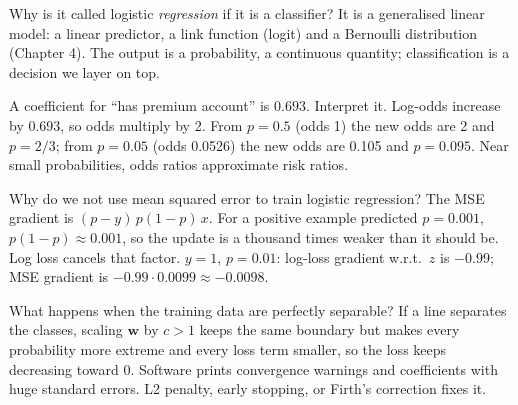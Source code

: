 \begin{qa}{Why is it called logistic \emph{regression} if it is a classifier?}
\why It is a generalised linear model: a linear predictor, a link function (logit) and a Bernoulli distribution
(Chapter 4). The output is a probability, a continuous quantity; classification is a decision we layer on top.
\end{qa}

\begin{qa}{A coefficient for ``has premium account'' is $0.693$. Interpret it.}
\why Log-odds increase by 0.693, so odds multiply by 2. From $p = 0.5$ (odds 1) the new odds are 2 and $p = 2/3$; from
$p=0.05$ (odds 0.0526) the new odds are 0.105 and $p = 0.095$. Near small probabilities, odds ratios approximate risk
ratios.
\end{qa}

\begin{qa}{Why do we not use mean squared error to train logistic regression?}
\why The MSE gradient is $(p - y)\,p(1-p)\,x$. For a positive example predicted $p = 0.001$, $p(1-p)\approx0.001$, so
the update is a thousand times weaker than it should be. Log loss cancels that factor.
\worked $y = 1$, $p = 0.01$: log-loss gradient w.r.t.\ $z$ is $-0.99$; MSE gradient is $-0.99\cdot0.0099\approx -0.0098$.
\end{qa}

\begin{qa}{What happens when the training data are perfectly separable?}
\why If a line separates the classes, scaling $\mathbf w$ by $c>1$ keeps the same boundary but makes every probability
more extreme and every loss term smaller, so the loss keeps decreasing toward 0. Software prints convergence warnings
and coefficients with huge standard errors. L2 penalty, early stopping, or Firth's correction fixes it.
\end{qa}

